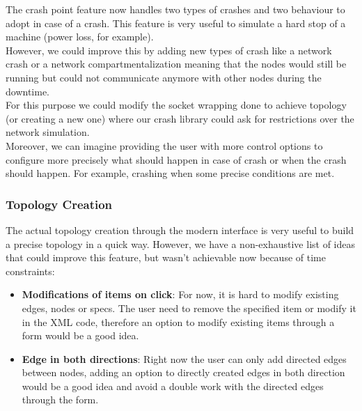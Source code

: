 \documentclass{eplmastersthesis}
\begin{document}
          The crash point feature now handles two types of crashes and two
          behaviour to adopt in case of a crash. This feature is very useful
          to simulate a hard stop of a machine (power loss, for example).\\
          However, we could improve this by adding new types of crash like a
          network crash or a network compartmentalization meaning that the
          nodes would still be running but could not communicate anymore
          with other nodes during the downtime.\\
          For this purpose we could modify the socket wrapping done to achieve
          topology (or creating a new one) where our crash library could ask
          for restrictions over the network simulation.\\

          Moreover, we can imagine providing the user with more control options
          to configure more precisely what should happen in case of crash or
          when the crash should happen. For example, crashing when some
          precise conditions are met.

        \subsubsection{Topology Creation}

          The actual topology creation through the modern interface is very
          useful to build a precise topology in a quick way. However, we have
          a non-exhaustive list of ideas that could improve this feature, but
          wasn't achievable now because of time constraints:

          \begin{itemize}
            \item \textbf{Modifications of items on click}: For now, it is hard
            to modify existing edges, nodes or specs. The user need to remove
            the specified item or modify it in the XML code, therefore
            an option to modify existing items through a form would be a good
            idea.
            \item \textbf{Edge in both directions}: Right now the user can only
            add directed edges between nodes, adding an option to directly
            created edges in both direction would be a good idea and
            avoid a double work with the directed edges through the form.
          \end{itemize}
\end{document}
